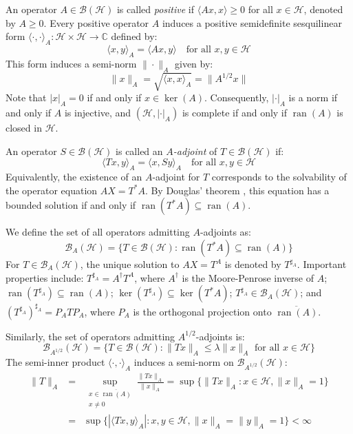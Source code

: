 \documentclass{article}
\begin{document}
An operator $A \in \mathcal{B}(\mathcal{H})$ is called \textit{positive} if $\langle Ax, x \rangle \geq 0$ for all $x \in \mathcal{H}$, denoted by $A \geq 0$. Every positive operator $A$ induces a positive semidefinite sesquilinear form $\langle \cdot, \cdot \rangle_A : \mathcal{H} \times \mathcal{H} \to \mathbb{C}$ defined by:
\[
\langle x, y \rangle_A = \langle Ax, y \rangle \quad \text{for all } x, y \in \mathcal{H}
\]
This form induces a semi-norm $\|\cdot\|_A$ given by:
\[
\|x\|_A = \sqrt{\langle x, x \rangle_A} = \|A^{1/2}x\|
\]
Note that $|x|_A = 0$ if and only if $x \in \ker(A)$. Consequently, $|\cdot|_A$ is a norm if and only if $A$ is injective, and $(\mathcal{H}, |\cdot|_A)$ is complete if and only if $\operatorname{ran}(A)$ is closed in $\mathcal{H}$.

An operator $S \in \mathcal{B}(\mathcal{H})$ is called an \textit{$A$-adjoint} of $T \in \mathcal{B}(\mathcal{H})$ if:
\[
\langle Tx, y \rangle_A = \langle x, Sy \rangle_A \quad \text{for all } x, y \in \mathcal{H}
\]
Equivalently, the existence of an $A$-adjoint for $T$ corresponds to the solvability of the operator equation $AX = T^*A$. By Douglas' theorem \cite{Douglas}, this equation has a bounded solution if and only if $\operatorname{ran}(T^*A) \subseteq \operatorname{ran}(A)$.

We define the set of all operators admitting $A$-adjoints as:
\[
\mathcal{B}_A(\mathcal{H}) = \{T \in \mathcal{B}(\mathcal{H}) : \operatorname{ran}(T^*A) \subseteq \operatorname{ran}(A)\}
\]
For $T \in \mathcal{B}_A(\mathcal{H})$, the unique solution to $AX = T^A$ is denoted by $T^{\sharp_A}$. Important properties include: $T^{\sharp_A} = A^{\dag}T^A$, where $A^{\dag}$ is the Moore-Penrose inverse of $A$; $\operatorname{ran}(T^{\sharp_A}) \subseteq \operatorname{ran}(A)$; $\ker(T^{\sharp_A}) \subseteq \ker(T^*A)$; $T^{\sharp_A} \in \mathcal{B}_A(\mathcal{H})$; and $(T^{\sharp_A})^{\sharp_A} = P_ATP_A$, where $P_A$ is the orthogonal projection onto $\overline{\operatorname{ran}(A)}$.

Similarly, the set of operators admitting $A^{1/2}$-adjoints is:
\[
\mathcal{B}_{A^{1/2}}(\mathcal{H}) = \{T \in \mathcal{B}(\mathcal{H}) : \|Tx\|_A \leq \lambda\|x\|_A \text{ for all } x \in \mathcal{H}\}
\]
The semi-inner product $\langle \cdot, \cdot \rangle_A$ induces a semi-norm on $\mathcal{B}_{A^{1/2}}(\mathcal{H})$:
\begin{eqnarray*}
  \|T\|_A &=&\sup_{\substack{x \in \overline{\operatorname{ran}(A)} \\ x \neq 0}} \frac{\|Tx\|_A}{\|x\|_A}=
   \sup\{\|Tx\|_A : x \in \mathcal{H}, \|x\|_A = 1\} \\
   &=&\sup\{|\langle Tx, y \rangle_A| : x, y \in \mathcal{H}, \|x\|_A = \|y\|_A = 1\} < \infty
\end{eqnarray*}
\end{document}
